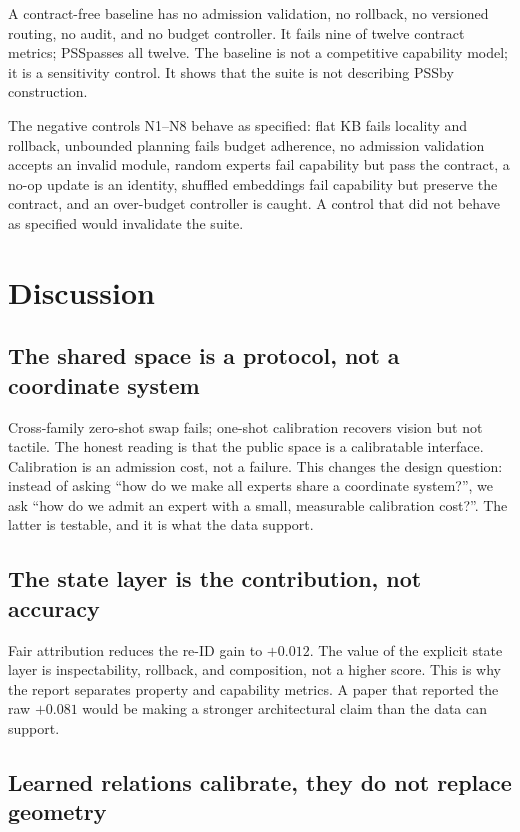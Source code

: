 \documentclass[10pt]{article}
\newcommand{\pss}{PSS}
\begin{document}
A contract-free baseline has no admission validation, no rollback, no versioned
routing, no audit, and no budget controller. It fails nine of twelve contract
metrics; \pss passes all twelve. The baseline is not a competitive capability
model; it is a sensitivity control. It shows that the suite is not describing
\pss by construction.

The negative controls N1--N8 behave as specified: flat KB fails locality and
rollback, unbounded planning fails budget adherence, no admission validation
accepts an invalid module, random experts fail capability but pass the contract,
a no-op update is an identity, shuffled embeddings fail capability but preserve
the contract, and an over-budget controller is caught. A control that did not
behave as specified would invalidate the suite.

\section{Discussion}
\label{sec:discussion}

\subsection{The shared space is a protocol, not a coordinate system}

Cross-family zero-shot swap fails; one-shot calibration recovers vision but not
tactile. The honest reading is that the public space is a calibratable
interface. Calibration is an admission cost, not a failure. This changes the
design question: instead of asking ``how do we make all experts share a
coordinate system?'', we ask ``how do we admit an expert with a small,
measurable calibration cost?''. The latter is testable, and it is what the data
support.

\subsection{The state layer is the contribution, not accuracy}

Fair attribution reduces the re-ID gain to $+0.012$. The value of the explicit
state layer is inspectability, rollback, and composition, not a higher score.
This is why the report separates property and capability metrics. A paper that
reported the raw $+0.081$ would be making a stronger architectural claim than
the data can support.

\subsection{Learned relations calibrate, they do not replace geometry}
\end{document}
